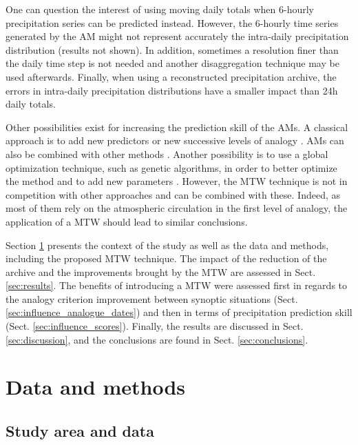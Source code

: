 \documentclass[hess, manuscript]{copernicus}
\begin{document}
	
	One can question the interest of using moving daily totals when 6-hourly precipitation series can be predicted instead. However, the 6-hourly time series generated by the AM might not represent accurately the intra-daily precipitation distribution (results not shown). In addition, sometimes a resolution finer than the daily time step is not needed and another disaggregation technique may be used afterwards. Finally, when using a reconstructed precipitation archive, the errors in intra-daily precipitation distributions have a smaller impact than 24h daily totals.
	
	
	
	
	Other possibilities exist for increasing the prediction skill of the AMs. A classical approach is to add new predictors or new successive levels of analogy \citep[see e.g.][]{Horton2012a, BenDaoud2016, Caillouet2016}. AMs can also be combined with other methods \citep[see e.g.][]{Chardon2014}. Another possibility is to use a global optimization technique, such as genetic algorithms, in order to better optimize the method and to add new parameters \citep{Horton2016}. However, the MTW technique is not in competition with other approaches and can be combined with these. Indeed, as most of them rely on the atmospheric circulation in the first level of analogy, the application of a MTW should lead to similar conclusions.
	
	Section \ref{sec:data_methods} presents the context of the study as well as the data and methods, including the proposed MTW technique. The impact of the reduction of the archive and the improvements brought by the MTW are assessed in Sect. \ref{sec:results}. The benefits of introducing a MTW were assessed first in regards to the analogy criterion improvement between synoptic situations (Sect. \ref{sec:influence_analogue_dates}) and then in terms of precipitation prediction skill (Sect. \ref{sec:influence_scores}). Finally, the results are discussed in Sect. \ref{sec:discussion}, and the conclusions are found in Sect. \ref{sec:conclusions}.
	
	
	\section{Data and methods}
	\label{sec:data_methods}
	
	\subsection{Study area and data}
	\label{sec:data}
	
\end{document}
